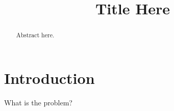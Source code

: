 \documentclass[conference]{IEEEtran}
\newcommand{\papertitle}{Title Here}
\begin{document}

\title{\papertitle}
\author{
\and
{}
}



\maketitle

\begin{abstract}
Abstract here.
\end{abstract}

\IEEEpeerreviewmaketitle

\section{Introduction}

What is the problem? \cite{example}

\end{document}
